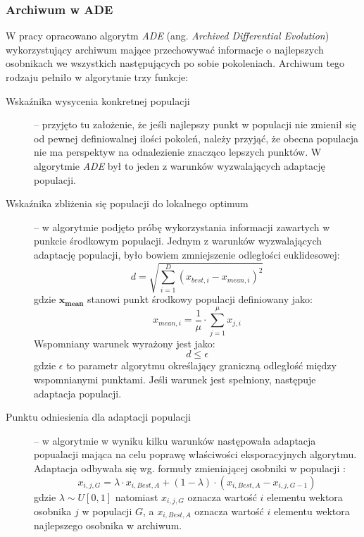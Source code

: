 \documentclass[12pt,a4paper]{report}
\begin{document}
{{{\subsubsection{Archiwum w ADE \cite{ArchivedDE,RobustArchiveDE}}
\par{
W pracy \cite{ArchivedDE} opracowano algorytm \emph{ADE} (ang. \emph{Archived Differential Evolution}) wykorzystujący archiwum mające przechowywać informacje o najlepszych osobnikach we wszystkich następujących po sobie pokoleniach. Archiwum tego rodzaju pełniło w algorytmie trzy funkcje:
\begin{description}
\item[Wskaźnika wysycenia konkretnej populacji] -- przyjęto tu założenie, że jeśli najlepszy punkt w populacji nie zmienił się od pewnej definiowalnej ilości pokoleń, należy przyjąć, że obecna populacja nie ma perspektyw na odnalezienie znacząco lepszych punktów. W algorytmie \emph{ADE} był to jeden z warunków wyzwalających adaptację populacji.
\item[Wskaźnika zbliżenia się populacji do lokalnego optimum] -- w algorytmie podjęto próbę wykorzystania informacji zawartych w punkcie środkowym populacji. Jednym z warunków wyzwalających adaptację populacji, było bowiem zmniejszenie odległości euklidesowej:
\begin{equation}
d = \sqrt{\sum_{i = 1}^{D}(x_{best,i} - x_{mean,i})^2}
\end{equation}
gdzie $\mathbf{x_{mean}}$ stanowi punkt środkowy populacji definiowany jako:
\begin{equation}
x_{mean,i} = \frac{1}{\mu} \cdot \sum_{j = 1}^{\mu}x_{j,i}
\end{equation}
Wspomniany warunek wyrażony jest jako:
\begin{equation}
d \le \epsilon
\end{equation}
gdzie $\epsilon$ to parametr algorytmu określający graniczną odległość między wspomnianymi punktami.
Jeśli warunek jest spełniony, następuje adaptacja populacji.
\item[Punktu odniesienia dla adaptacji populacji] -- w algorytmie w wyniku kilku warunków następowała adaptacja popualacji mająca na celu poprawę właściwości eksporacyjnych algorytmu. Adaptacja odbywała się wg. formuły zmieniającej osobniki w populacji \cite{ArchivedDE}:
\begin{equation}
x_{i,j,G} = \lambda \cdot x_{i,Best,A} + (1 - \lambda) \cdot (x_{i,Best,A} - x_{i,j,G-1})
\end{equation}
gdzie $\lambda \sim U[0,1]$ natomiast $x_{i,j,G}$ oznacza wartość $i$ elementu wektora osobnika $j$ w populacji $G$, a $x_{i,Best,A}$ oznacza wartość $i$ elementu wektora najlepszego osobnika w archiwum.

\end{description}}}}}
\end{document}
